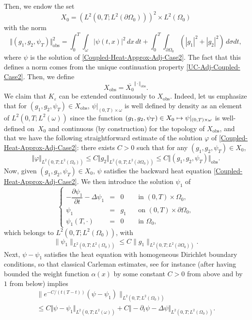 \documentclass[JEP,XML,SOM,Unicode,NoFloatCountersInSection]{cedram}
\newcommand\mto{\mathchoice{\longmapsto}{\mapsto}{\mapsto}{\mapsto}}
\newcommand{\obs}{\mathrm{obs}}
\newcommand{\norm}[1]{\Vert#1\Vert}
\theoremstyle{definition}
\begin{document}
Then, we endow the set
\[
X_{0} = (L^2(0,T; L^2(\partial \Omega_0)))^2 \times L^2(\Omega_0)
\]
with the norm
\[
\norm{(g_1, g_2, \psi_T)}_{\obs}^2
=
\int_0^T \int_\omega |\psi(t,x)|^2 \, dx\,dt
+
\int_0^T \int_{\partial \Omega_0} \left(| g_1|^2 + |g_2|^2 \right) \, d\sigma dt,
\]
where $\psi$ is the solution of \eqref{Coupled-Heat-Approx-Adj-Case2}. The fact that this defines a norm comes from the unique continuation property \eqref{UC-Adj-Coupled-Case2}. Then, we define\begin{equation*}
X_{\obs} = \overline{X_{0}}^{\norm{\cdot}_{\obs}}.
\end{equation*}
We claim that $K_\varepsilon$ can be extended continuously to $X_{\obs}$. Indeed, let us emphasize that for $(g_1, g_2, \psi_T) \in X_{\obs}$, $\psi|_{(0,T) \times \omega}$ is well defined by density as an element of $L^2(0,T;L^2(\omega))$ since the function $(g_1, g_2, \psi_T) \in X_{0} \mto \psi|_{(0,T) \times \omega}$ is well-defined on~$X_0$ and continuous (by construction) for the topology of $X_{\obs}$, and that we have the following straightforward estimate of the solution $\varphi$ of \eqref{Coupled-Heat-Approx-Adj-Case2}: there exists $C>0$ such that for any $(g_1, g_2, \psi_T) \in X_{0}$,
\begin{equation}
\label{Est-Varphi-Direct}
\norm{ \varphi }_{L^2(0,T; L^2(\Omega_0))} \leq C \norm{ g_2}_{L^2(0,T; L^2(\partial \Omega_0))} \leq C \norm{(g_1, g_2, \psi_T)}_{\obs}.
\end{equation}
Now, given $(g_1, g_2, \psi_T) \in X_0$, $\psi$ satisfies the backward heat equation \eqref{Coupled-Heat-Approx-Adj-Case2}. We then introduce the solution $\psi_1$ of
\[
\left\{
\begin{array}{rcll}
- \dfrac{\partial \psi_1}{\partial t}-\Delta \psi_1 &=& 0 \quad&\text{ in }(0,T) \times \Omega_0,
\\
\psi_1 &=& g_1 &\text{ on }(0,T) \times \partial \Omega_0,
\\
\psi_1 \left(T,\cdot\right) &=& 0 &\text{ in }\Omega_0,
\end{array}
\right.
\]
which belongs to $L^2(0,T; L^2(\Omega_0))$, with
\[
\| \psi_1 \|_{L^2(0,T; L^2(\Omega_0))} \leq C \| g_1\|_{ L^2(0,T; L^2(\partial \Omega_0))}.
\]
Next, $\psi - \psi_1$ satisfies the heat equation with homogeneous Dirichlet boundary conditions, so that classical Carleman estimates, see for instance \cite[Th.\,9.4.1]{TWBook} (after having bounded the weight function $\alpha(x)$ by some constant $C>0$ from above and by $1$ from below) implies
\begin{multline*}
\| e^{-C/(t(T-t))} (\psi - \psi_1) \|_{L^2(0,T; L^2(\Omega_0))}\\
\leq
C \norm{\psi- \psi_1}_{L^2(0,T; L^2(\omega))}
+
{C\norm{ - \partial_t \psi - \Delta \psi }_{L^2(0,T; L^2(\Omega_0))}}.
\end{multline*}
\end{document}
